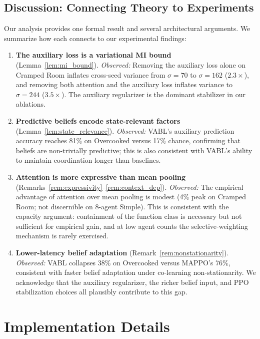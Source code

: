 \documentclass{article}
\theoremstyle{plain}
\theoremstyle{definition}
\theoremstyle{remark}
\begin{document}
\subsection{Discussion: Connecting Theory to Experiments}

Our analysis provides one formal result and several architectural arguments. We summarize how each connects to our experimental findings:

\begin{enumerate}
\item \textbf{The auxiliary loss is a variational MI bound} (Lemma~\ref{lem:mi_bound}). \emph{Observed:} Removing the auxiliary loss alone on Cramped Room inflates cross-seed variance from $\sigma{=}70$ to $\sigma{=}162$ ($2.3\times$), and removing both attention and the auxiliary loss inflates variance to $\sigma{=}244$ ($3.5\times$). The auxiliary regularizer is the dominant stabilizer in our ablations.

\item \textbf{Predictive beliefs encode state-relevant factors} (Lemma~\ref{lem:state_relevance}). \emph{Observed:} VABL's auxiliary prediction accuracy reaches 81\% on Overcooked versus 17\% chance, confirming that beliefs are non-trivially predictive; this is also consistent with VABL's ability to maintain coordination longer than baselines.

\item \textbf{Attention is more expressive than mean pooling} (Remarks~\ref{rem:expressivity}--\ref{rem:context_dep}). \emph{Observed:} The empirical advantage of attention over mean pooling is modest (4\% peak on Cramped Room; not discernible on 8-agent Simple). This is consistent with the capacity argument: containment of the function class is necessary but not sufficient for empirical gain, and at low agent counts the selective-weighting mechanism is rarely exercised.

\item \textbf{Lower-latency belief adaptation} (Remark~\ref{rem:nonstationarity}). \emph{Observed:} VABL collapses 38\% on Overcooked versus MAPPO's 76\%, consistent with faster belief adaptation under co-learning non-stationarity. We acknowledge that the auxiliary regularizer, the richer belief input, and PPO stabilization choices all plausibly contribute to this gap.
\end{enumerate}

\section{Implementation Details}
\label{app:implementation}
\end{document}
